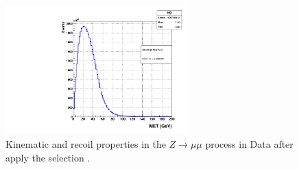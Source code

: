 \begin{figure}[!ht]
\begin{tabular}{cc}
\end{tabular}
\begin{center}
  \includegraphics[width=200pt]{figuresARC/recoil/met.pdf}
\end{center}
\caption{Kinematic and recoil properties in the $Z \to \mu \mu$ process in Data after apply the selection .}
\label{fig:METrecoil1}
\end{figure}

